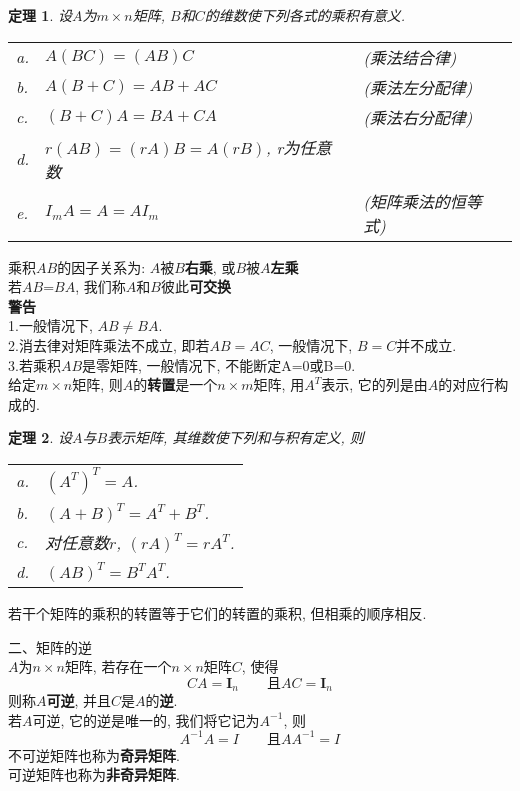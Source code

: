 \documentclass[UTF8,fontset=ubuntu]{ctexart}
\theoremstyle{plain}
\newtheorem{theorem}{定理}
\theoremstyle{nonumberplain}
\theoremstyle{empty}
\begin{document}
\begin{theorem}
设$A$为$m\times n$矩阵, $B$和$C$的维数使下列各式的乘积有意义.\\
\begin{tabular}{l@{\ }l l}
a. & $A(BC)=(AB)C$ & (乘法结合律)\\
b. & $A(B+C)=AB+AC$ & (乘法左分配律)\\
c. & $(B+C)A=BA+CA$ & (乘法右分配律)\\
d. & $r(AB)=(rA)B=A(rB)$, r为任意数 &\\
e. & $I_mA=A=AI_m$ & (矩阵乘法的恒等式)
\end{tabular}
\end{theorem}\vspace{4ex}

乘积$AB$的因子关系为: $A$被$B$\textbf{右乘}, 或$B$被$A$\textbf{左乘}\\
若$AB$=$BA$, 我们称$A$和$B$彼此\textbf{可交换}\\[2ex]

\textbf{警告}\\
1.一般情况下, $AB\neq BA$.\\
2.消去律对矩阵乘法不成立, 即若$AB=AC$, 一般情况下, $B=C$并不成立.\\
3.若乘积$AB$是零矩阵, 一般情况下, 不能断定A=0或B=0.\\[2ex]

给定$m\times n$矩阵, 则$A$的\textbf{转置}是一个$n\times m$矩阵, 用$A^T$表示, 它的列是由$A$的对应行构成的.\\[2ex]

\begin{theorem}
设$A$与$B$表示矩阵, 其维数使下列和与积有定义, 则\\
\begin{tabular}{l@{\ }l}
a. & $(A^T)^T=A$.\\
b. & $(A+B)^T=A^T+B^T$.\\
c. & 对任意数$r$, $(rA)^T=rA^T$.\\
d. & $(AB)^T=B^TA^T$.
\end{tabular}
\end{theorem}\vspace{4ex}

\begin{law}
若干个矩阵的乘积的转置等于它们的转置的乘积, 但相乘的顺序相反.
\end{law}\vspace{8ex}

二、矩阵的逆\\[1ex]
$A$为$n\times n$矩阵, 若存在一个$n\times n$矩阵$C$, 使得
\[CA=\bm{I}_n\qquad\text{且}AC=\bm{I}_n\]
则称$A$\textbf{可逆}, 并且$C$是$A$的\textbf{逆}.\\[2ex]
若$A$可逆, 它的逆是唯一的, 我们将它记为$A^{-1}$, 则
\[A^{-1}A=I\qquad\text{且}AA^{-1}=I\]
不可逆矩阵也称为\textbf{奇异矩阵}.\\
可逆矩阵也称为\textbf{非奇异矩阵}.\\[2ex]
\end{document}

